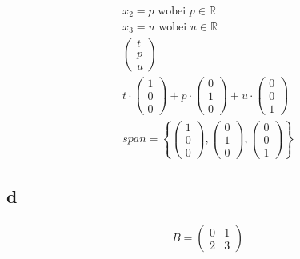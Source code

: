 \begin{align*}
    x_2 = p \text{ wobei } p \in \mathbb{R} \\
    x_3 = u \text{ wobei } u \in \mathbb{R} \\
    \begin{pmatrix}
        t \\ p \\ u
    \end{pmatrix} \\
    t \cdot \begin{pmatrix}
        1 \\ 0 \\ 0
    \end{pmatrix} + p \cdot \begin{pmatrix}
        0 \\ 1 \\ 0
    \end{pmatrix} + u \cdot \begin{pmatrix}
        0 \\ 0 \\ 1
    \end{pmatrix} \\
    span = \left\{\begin{pmatrix}
        1 \\ 0 \\ 0
    \end{pmatrix}, \begin{pmatrix}
        0 \\ 1 \\ 0
    \end{pmatrix}, \begin{pmatrix}
        0 \\ 0 \\ 1
    \end{pmatrix}\right\}
\end{align*}

\subsection{d}

\begin{align*}
    B = \begin{pmatrix}
        0 & 1 \\
        2 & 3
    \end{pmatrix}
\end{align*}

